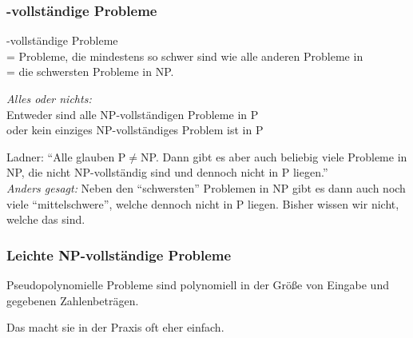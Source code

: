 \documentclass[aspectratio=1610,onlymath]{beamer}
\begin{document}
\maketitle

\begin{frame}\frametitle{-vollständige Probleme}

-vollständige Probleme\\ = Probleme, die mindestens so schwer
sind wie alle anderen Probleme in \\
= die schwersten Probleme in NP.
\bigskip

\emph{Alles oder nichts:}\\
Entweder sind alle NP-vollständigen Probleme in P\\
oder kein einziges NP-vollständiges Problem ist in P
\bigskip\pause

\alert{Ladner:} "`Alle glauben P${}\neq{}$NP. Dann gibt es aber auch 
beliebig viele Probleme in NP, die nicht NP-vollständig sind und dennoch nicht in P liegen."'
\\
\medskip
\emph{Anders gesagt:} Neben den "`schwersten"' Problemen in NP gibt es dann auch noch viele "`mittelschwere"', welche dennoch nicht in P liegen. Bisher wissen wir nicht, welche das
sind.

\end{frame}

\begin{frame}\frametitle{Leichte NP-vollständige Probleme}

Pseudopolynomielle Probleme sind polynomiell in der Größe von
Eingabe und gegebenen Zahlenbeträgen.
\bigskip

Das macht sie in der Praxis oft eher einfach.
\bigskip


\end{frame}

\end{document}
